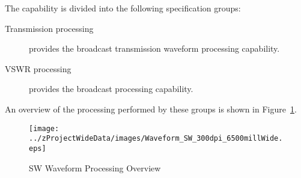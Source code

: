 The \ThisSys \ThisSegment \SW capability is divided into the following specification groups:
\begin{description}
	\item[Transmission processing] provides the \SW broadcast transmission waveform processing capability.
	\item[VSWR processing] provides the \SW broadcast \VSWR processing capability.
\end{description}
An overview of the processing performed by these groups is shown in Figure~\ref{fig:SW_Waveform_Processing}.
\begin{figure}[htbp]
	\centering
		\texttt{[image: ../zProjectWideData/images/Waveform\_SW\_300dpi\_6500millWide.eps]}
	\caption[SW Waveform Processing Overview]{SW Waveform Processing Overview}
	\label{fig:SW_Waveform_Processing}
\end{figure}

%
%
%

